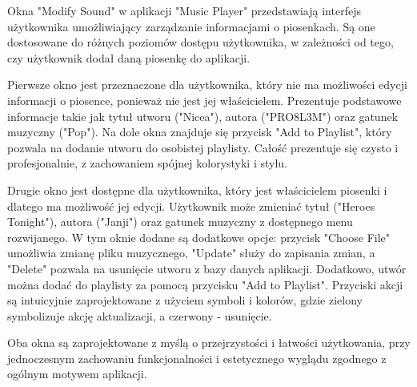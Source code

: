 {
Okna "Modify Sound" w aplikacji "Music Player" przedstawiają interfejs użytkownika umożliwiający zarządzanie informacjami o piosenkach. Są one dostosowane do różnych poziomów dostępu użytkownika, w zależności od tego, czy użytkownik dodał daną piosenkę do aplikacji.

Pierwsze okno jest przeznaczone dla użytkownika, który nie ma możliwości edycji informacji o piosence, ponieważ nie jest jej właścicielem. Prezentuje podstawowe informacje takie jak tytuł utworu ("Nicea"), autora ("PRO8L3M") oraz gatunek muzyczny ("Pop"). Na dole okna znajduje się przycisk "Add to Playlist", który pozwala na dodanie utworu do osobistej playlisty. Całość prezentuje się czysto i profesjonalnie, z zachowaniem spójnej kolorystyki i stylu.

Drugie okno jest dostępne dla użytkownika, który jest właścicielem piosenki i dlatego ma możliwość jej edycji. Użytkownik może zmieniać tytuł ("Heroes Tonight"), autora ("Janji") oraz gatunek muzyczny z dostępnego menu rozwijanego. W tym oknie dodane są dodatkowe opcje: przycisk "Choose File" umożliwia zmianę pliku muzycznego, "Update" służy do zapisania zmian, a "Delete" pozwala na usunięcie utworu z bazy danych aplikacji. Dodatkowo, utwór można dodać do playlisty za pomocą przycisku "Add to Playlist". Przyciski akcji są intuicyjnie zaprojektowane z użyciem symboli i kolorów, gdzie zielony symbolizuje akcję aktualizacji, a czerwony - usunięcie.

Oba okna są zaprojektowane z myślą o przejrzystości i łatwości użytkowania, przy jednoczesnym zachowaniu funkcjonalności i estetycznego wyglądu zgodnego z ogólnym motywem aplikacji.
}
\newpage

